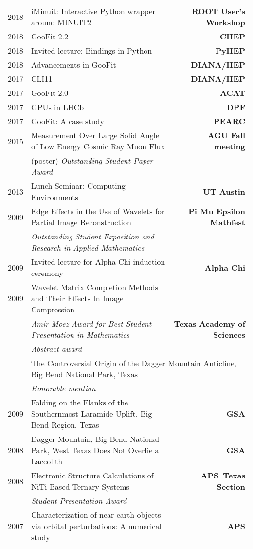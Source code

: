 \documentclass[10pt,letterpaper,english]{moderncv}
\begin{document}
\begin{tabularx}{\textwidth}{p{.35in}X>{\bfseries}r}
	2018 & iMinuit: Interactive Python wrapper around MINUIT2 & ROOT User's Workshop \\  %
	2018 & GooFit 2.2 & CHEP \\ %
	2018 & Invited lecture: Bindings in Python & PyHEP  \\
    2018 & Advancements in GooFit & DIANA/HEP \\
	2017 & CLI11 & DIANA/HEP \\
	2017 & GooFit 2.0 & ACAT \\
	2017 & GPUs in LHCb & DPF \\ %
	2017 & GooFit: A case study & PEARC \\
	
	
	2015 & Measurement Over Large Solid Angle of Low Energy Cosmic Ray Muon Flux &  AGU Fall meeting \\
	 & (poster) \emph{Outstanding Student Paper Award} & \\
	 2013 & Lunch Seminar: Computing Environments & UT Austin \\
	 2009 & Edge Effects in the Use of Wavelets for Partial Image Reconstruction & Pi Mu Epsilon Mathfest \\
	 & \emph{Outstanding Student Exposition and Research in Applied Mathematics} & \\
	 
	 2009 & Invited lecture for Alpha Chi induction ceremony & Alpha Chi  \\
	 
	 2009 & Wavelet Matrix Completion Methods and Their Effects In Image Compression &  \\
	  & \emph{Amir Moez Award for Best Student Presentation in Mathematics} & Texas Academy of Sciences \\
	  & \emph{Abstract award} & \\
	  & \multicolumn{2}{l}{The Controversial Origin of the Dagger Mountain Anticline, Big Bend National Park, Texas}  \\
	  & \emph{Honorable mention} & \\
	  
	  
	  2009 & Folding on the Flanks of the Southernmost Laramide Uplift, Big Bend Region, Texas & GSA \\[1em]
	  
	  2008 & Dagger Mountain, Big Bend National Park, West Texas Does Not Overlie a Laccolith & GSA \\[1em]
	 
	 2008 & Electronic Structure Calculations of NiTi Based Ternary Systems  & APS--Texas Section \\
	 & \emph{Student Presentation Award} & \\
	 
	 2007 & Characterization of near earth objects via orbital perturbations: A numerical study & APS
	 
\end{tabularx}
\end{document}
